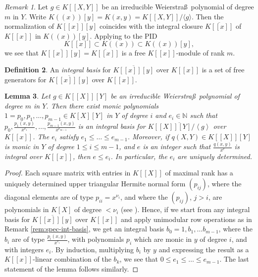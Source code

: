 \documentclass[a4paper,11pt]{amsart}%
\theoremstyle{definition}
\newtheorem{defn}{Definition}[section]
\theoremstyle{plain}
\newtheorem{lemma}[defn]{Lemma}
\theoremstyle{remark}
\newtheorem{remark}[defn]{Remark}
\begin{document}
\begin{remark}
Let $g\in K[[X,Y]]$ be an irreducible Weierstra\ss \ polynomial of degree $m$
in $Y$. Write $K((x))[y]=K(x,y)=K[[X,Y]]/ \langle g \rangle$. Then the
normalization of $K[[x]][y]$ coincides with the integral closure $\overline{K[[x]]}$ of
$K[[x]]$ in $K((x))[y]$. Applying \cite[Theorem 3.3.4]{Stichtenoth08} to the PID 
$$K[[x]]\subset K((x))\subset K((x))[y],$$ we see that
$\overline{K[[x]][y]}=\overline{K[[x]]}$
is a free $K[[x]]$-module of rank $m$. 
\end{remark}

\begin{defn}
An \emph{integral basis} for $\overline{K[[x]][y]}$ over $K[[x]]$ is a set
of free generators for $\overline{K[[x]][y]}$ over $K[[x]]$.
\end{defn}

\begin{lemma}
\label{lem intbas power series}Let $g\in K[[X]][Y]$ be an irreducible
Weierstra\ss \ polynomial of degree $m$ in $Y$. Then there exist monic
polynomials
$1=p_{0},p_{1},\ldots,p_{m-1}\in K[X][Y]$ in $Y$  of degree $i$ and
$e_{i}\in\mathbb{N}$ such that $p_{0},\frac{p_{1}(x,y)}{x^{e_{1}}},\ldots
,\frac{p_{m-1}(x,y)}{x^{e_{m-1}}}$ is an integral basis for $\overline
{K[[X]][Y]/\left\langle g\right\rangle }$ over $K[[x]]$.
The $e_i$ satisfy $e_1\leq \dots \leq e_{m-1}$.
Moreover, if $q(X,Y)\in K[[X]][Y]$ is monic in $Y$ of degree $1\leq i\leq m-1$,
and $e$ is an integer such that $\frac{q(x,y)}{x^e}$ is integral over $K[[x]]$,
then $e\leq e_i$. In particular, the $e_i$ are uniquely determined.
\end{lemma}

\begin{proof}
Each square matrix with entries in $K[[X]]$ of maximal rank has a uniquely
determined upper triangular Hermite normal form $(p_{ij})$, where the diagonal elements 
are of type $p_{ii}=x^{\nu_i}$, and where the $(p_{ij})$, $j>i$, are polynomials in $K[X]$ of degree 
$<\nu_i$ (see \cite{Durvye84}). Hence, if we start from any integral basis for $\overline{K[[x]][y]}$ over $K[[x]]$
and apply unimodular row operations as in Remark \ref{rem:spec-int-basis}, we get an 
integral basis $b_0=1, b_1, \dots b_{m-1}$, where the $b_i$ are of type $\frac{p_{i}(x,y)}{x^{e_{i}}}$, 
with polynomials $p_i$ which are monic in $y$ of degree $i$, and with integers $e_i$. 
By induction, multiplying $b_i$ by $y$ and expressing the result 
as a $K[[x]]$-linear combination of  the $b_k$, we see that $0\leq e_1\leq \dots \leq e_{m-1}$. 
The last statement of the lemma follows similarly.
\end{proof}
\end{document}

